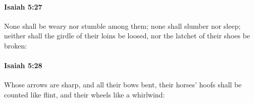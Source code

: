 		\paragraph{Isaiah 5:27} %
			\label{ISAIAH-5-27}

			None shall be weary nor stumble among them; none shall slumber nor sleep; neither shall the girdle of their loins be loosed, nor the latchet of their shoes be broken:


		\paragraph{Isaiah 5:28} %
			\label{ISAIAH-5-28}

			Whose arrows are sharp, and all their bows bent, their horses' hoofs shall be counted like flint, and their wheels like a whirlwind:


